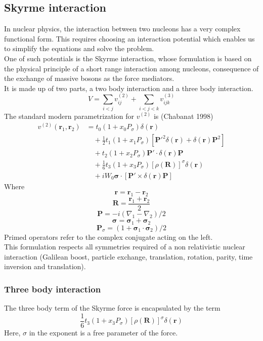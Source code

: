
\subsection{Skyrme interaction}
In nuclear physics, the interaction between two nucleons has a very complex functional form. This requires choosing an interaction potential which enables us to simplify the equations and solve the problem.
\\One of such potentials is the Skyrme interaction, whose formulation is based on the physical principle of a short range interaction among nucleons, consequence of the exchange of massive bosons as the force mediators.
\\It is made up of two parts, a two body interaction and a three body interaction.
\[V=\sum_{i<j}v_{ij}^{(2)}+\sum_{i<j<k}v_{ijk}^{(3)}\]
The standard modern parametrization for $v^{(2)}$ is (Chabanat 1998)
\begin{align*}
v^{(2)}(\mathbf{r}_1, \mathbf{r}_2) &= t_0 \left(1 + x_0 P_\sigma \right) \delta(\mathbf{r}) \\
&\quad + \frac{1}{2} t_1 \left(1 + x_1 P_\sigma \right) \left[ \mathbf{P}'^2 \delta(\mathbf{r}) + \delta(\mathbf{r}) \mathbf{P}^2 \right] \\
&\quad + t_2 \left(1 + x_2 P_\sigma \right) \mathbf{P}' \cdot \delta(\mathbf{r}) \mathbf{P} \\
&\quad + \frac{1}{6} t_3 \left(1 + x_3 P_\sigma \right) \left[ \rho(\mathbf{R}) \right]^\sigma \delta(\mathbf{r}) \\
&\quad + i W_0 \boldsymbol{\sigma}\cdot \left[ \mathbf{P}' \times \delta(\mathbf{r}) \mathbf{P} \right]
\end{align*}
Where 
\[\mathbf{r} = \mathbf{r}_1 - \mathbf{r}_2\]
\[\mathbf{R} = \frac{\mathbf{r}_1+\mathbf{r}_2}{2}\]
\[\mathbf{P} = -i(\nabla_1 - \nabla_2)/2\]
\[\boldsymbol{\sigma} = \boldsymbol{\sigma}_1 + \boldsymbol{\sigma}_2\]
\[\mathbf{P}_\sigma = (1+\boldsymbol{\sigma}_1\cdot\boldsymbol{\sigma}_2)/2\]
Primed operators refer to the complex conjugate acting on the left.
\\This formulation respects all symmetries required of a non relativistic nuclear interaction (Galilean boost, particle exchange, translation, rotation, parity, time inversion and translation).
\subsubsection{Three body interaction}
The three body term of the Skyrme force is encapsulated by the term 
\[\frac 1 6 t_3 \left(1 + x_3 P_\sigma \right) \left[ \rho(\mathbf{R}) \right]^\sigma \delta(\mathbf{r}) \]
Here, $\sigma$ in the exponent is a free parameter of the force.
